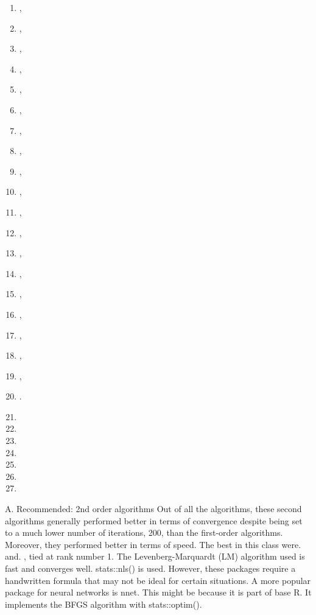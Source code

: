 \begin{enumerate}
\item
   \citep{R-rasclass},
\item
   \citep{R-rcane},
\item
   \citep{R-regressoR},
\item
   \citep{R-rminer},
\item
   \citep{R-rnn},
\item
   \citep{R-RSNNS},
\item
   \citep{R-ruta},
\item
   \citep{R-simpleNeural},
\item
   \citep{R-snnR},
\item
   \citep{R-softmaxreg},
\item
   \citep{R-Sojourn.Data},
\item
   \citep{R-spnn},
\item
   \citep{R-TeachNet},
\item
   \citep{R-tensorflow},
\item
   \citep{R-tfestimators},
\item
   \citep{R-trackdem},
\item
   \citep{R-TrafficBDE},
\item
   \citep{R-tsensembler},
\item
   \citep{R-validann},
\item
   \citep{R-zFactor}.
\item
\item
\item
\item
\item
\item
\item
\end{enumerate}

A. Recommended: 2nd order algorithms Out of all the algorithms, these
second algorithms generally performed better in terms of convergence
despite being set to a much lower number of iterations, 200, than the
first-order algorithms. Moreover, they performed better in terms of
speed. The best in this class were.  and.
, tied at rank number 1. The Levenberg-Marquardt (LM)
algorithm used is fast and converges well. stats::nls() is used.
However, these packages require a handwritten formula that may not be
ideal for certain situations. A more popular package for neural networks
is nnet. This might be because it is part of base R. It implements the
BFGS algorithm with stats::optim().

